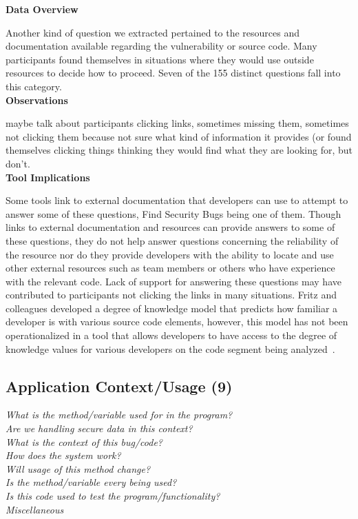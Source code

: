 \documentclass[conference]{IEEEtran}
\begin{document}
\noindent\textbf{Data Overview}


Another kind of question we extracted pertained to the resources and documentation available regarding the vulnerability or source code. 
Many participants found themselves in situations where they would use outside resources to decide how to proceed. 
Seven of the 155 distinct questions fall into this category. 
\\

\noindent\textbf{Observations}

maybe talk about participants clicking links, sometimes missing them, sometimes not clicking them because not sure what kind of information it provides (or found themselves clicking things thinking they would find what they are looking for, but don't.
\\

\noindent\textbf{Tool Implications}

Some tools link to external documentation that developers can use to attempt to answer some of these questions, Find Security Bugs being one of them. 
Though links to external documentation and resources can provide answers to some of these questions, they do not help answer questions concerning the reliability of the resource nor do they provide developers with the ability to locate and use other external resources such as team members or others who have experience with the relevant code.
Lack of support for answering these questions may have contributed to participants not clicking the links in many situations.  
Fritz and colleagues developed a degree of knowledge model that predicts how familiar a developer is with various source code elements, however, this model has not been operationalized in a tool that allows developers to have access to the degree of knowledge values for various developers on the code segment being analyzed~\cite{fritz2010degree}.



\noindent\subsection{\textbf{Application Context/Usage (9)}}\label{acu}

\noindent\emph{What is the method/variable used for in the program?} \\
\emph{Are we handling secure data in this context?} \\
\emph{What is the context of this bug/code?} \\
\emph{How does the system work?} \\
\emph{Will usage of this method change?} \\
\emph{Is the method/variable every being used?} \\
\emph{Is this code used to test the program/functionality?} \\
\emph{Miscellaneous} \\
\end{document}

